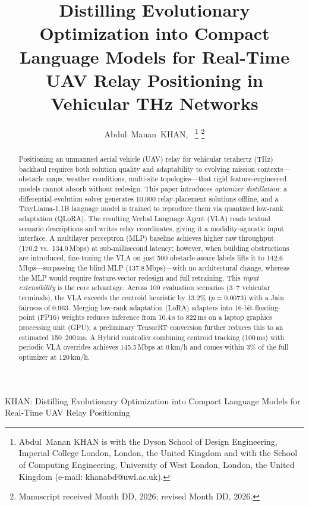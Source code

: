\documentclass[journal]{IEEEtran}
\begin{document}
\title{Distilling Evolutionary Optimization into Compact Language Models for Real-Time UAV Relay Positioning in Vehicular THz Networks}

\author{Abdul~Manan~KHAN,~%
\thanks{Abdul~Manan KHAN is with the Dyson School of Design Engineering, Imperial College London, London, the United Kingdom and with the School of Computing Engineering, University of West London, London, the United Kingdom (e-mail: khanabd@uwl.ac.uk).}%
\thanks{Manuscript received Month DD, 2026; revised Month DD, 2026.}}

%
{KHAN: Distilling Evolutionary Optimization into Compact Language Models for Real-Time UAV Relay Positioning}

\maketitle

\begin{abstract}
Positioning an unmanned aerial vehicle (UAV) relay for vehicular terahertz (THz) backhaul requires both solution quality and adaptability to evolving mission contexts---obstacle maps, weather conditions, multi-site topologies---that rigid feature-engineered models cannot absorb without redesign. This paper introduces \emph{optimizer distillation}: a differential-evolution solver generates 10{,}000 relay-placement solutions offline, and a TinyLlama-1.1B language model is trained to reproduce them via quantized low-rank adaptation (QLoRA). The resulting Verbal Language Agent (VLA) reads textual scenario descriptions and writes relay coordinates, giving it a modality-agnostic input interface. A multilayer perceptron (MLP) baseline achieves higher raw throughput (170.2 vs.\ 134.0\,Mbps) at sub-millisecond latency; however, when building obstructions are introduced, fine-tuning the VLA on just 500 obstacle-aware labels lifts it to 142.6\,Mbps---surpassing the blind MLP (137.8\,Mbps)---with no architectural change, whereas the MLP would require feature-vector redesign and full retraining. This \emph{input extensibility} is the core advantage. Across 100 evaluation scenarios (3--7 vehicular terminals), the VLA exceeds the centroid heuristic by 13.2\% ($p{=}0.0073$) with a Jain fairness of 0.963. Merging low-rank adaptation (LoRA) adapters into 16-bit floating-point (FP16) weights reduces inference from 10.4\,s to 822\,ms on a laptop graphics processing unit (GPU); a preliminary TensorRT conversion further reduces this to an estimated 150--200\,ms. A Hybrid controller combining centroid tracking (100\,ms) with periodic VLA overrides achieves 145.5\,Mbps at 0\,km/h and comes within 3\% of the full optimizer at 120\,km/h.
\end{abstract}
\end{document}
